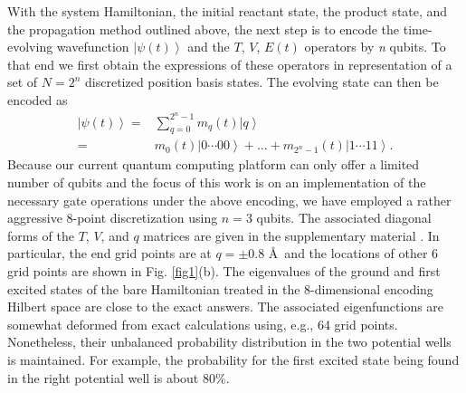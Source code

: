 \documentclass[twocolumn,showpacs,twoside,10pt,prl]{revtex4}
\newcommand{\nl}{\nonumber \\}
\begin{document}
With the system Hamiltonian, the initial reactant state, the product state, and the propagation method outlined above, the next step is
to encode the time-evolving wavefunction $\left\vert \psi({t}) \right\rangle$ and the $T$, $V$, $E(t)$ operators by \emph{n} qubits. To that end
we first obtain the expressions of these operators in representation of a set of $N=2^n$ discretized position basis states.
The evolving state can then be encoded as
\begin{align}\label{wave}
\left\vert \psi(t) \right\rangle=&\sum_{q=0}^{2^n-1}m_q(t)\left\vert q \right\rangle
\nl =&m_0(t)\left\vert 0\cdots00 \right\rangle+...+m_{2^n-1}(t)\left\vert 1\cdots11 \right\rangle.
\end{align}
Because our current quantum computing platform can only offer a limited number of qubits
and the focus of this work is on an
implementation of the necessary gate operations under the above encoding, we have employed
a rather aggressive 8-point discretization using $n=3$ qubits.  The associated diagonal forms of the
$T$, $V$, and $q$ matrices are
given in the supplementary material \cite{supplement}. In particular,
the end grid points are at $q=\pm 0.8$ \AA\, and the locations of other 6 grid points are shown in Fig. \ref{fig1}(b).
The eigenvalues of the ground and first excited states of the bare Hamiltonian
treated in the 8-dimensional encoding Hilbert space are close to the exact answers. The
associated eigenfunctions are somewhat deformed from exact calculations using, e.g., 64 grid points.
Nonetheless, their unbalanced probability distribution in the two potential wells is maintained.
For example, the probability for the first excited state being found in the right potential well is about $80\%$.
\end{document}
